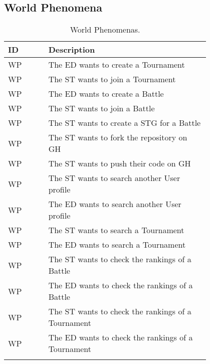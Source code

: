 \newpage

\subsection{World Phenomena}
\label{subsec:world_phenomena}%
\setcounter{wp}{1}
\newcommand{\cwp}{\thewp\stepcounter{wp}}
\begin{center}
    \begin{longtable}{ |l|p{0.8\linewidth}| }
        \hline
        \textbf{ID} & \textbf{Description}                                                \\
        \hline
        WP\cwp      & The ED wants to create a Tournament                           \\
        \hline
        WP\cwp      & The ST wants to join a Tournament   \\
        \hline
        WP\cwp      & The ED wants to create a Battle   \\
        \hline
        WP\cwp      & The ST wants to join a Battle   \\
        \hline
        WP\cwp      & The ST wants to create a STG for a Battle   \\
        \hline
        WP\cwp      & The ST wants to fork the repository on GH   \\
        \hline
        WP\cwp      & The ST wants to push their code on GH   \\
        \hline
        WP\cwp      & The ST wants to search another User profile   \\
        \hline
        WP\cwp      & The ED wants to search another User profile   \\
        \hline
        WP\cwp      & The ST wants to search a Tournament   \\
        \hline
        WP\cwp      & The ED wants to search a Tournament  \\
        \hline
        WP\cwp      & The ST wants to check the rankings of a Battle \\
        \hline
        WP\cwp      & The ED wants to check the rankings of a Battle \\
        \hline
        WP\cwp      & The ST wants to check the rankings of a Tournament \\
        \hline
        WP\cwp      & The ED wants to check the rankings of a Tournament \\
        \hline
        \caption{World Phenomenas.}
        \label{tab:worldph_tab}%
    \end{longtable}
\end{center}

